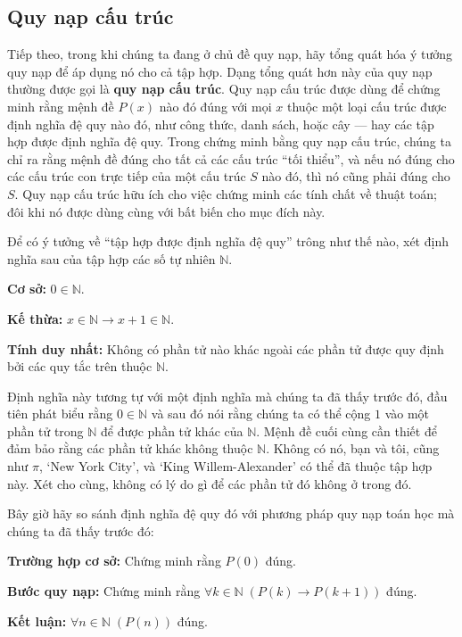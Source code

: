 \subsection{Quy nạp cấu trúc}

Tiếp theo, trong khi chúng ta đang ở chủ đề quy nạp, hãy tổng quát hóa ý tưởng quy nạp để áp dụng nó cho cả tập hợp. Dạng tổng quát hơn này của quy nạp thường được gọi là \textbf{quy nạp cấu trúc}. Quy nạp cấu trúc được dùng để chứng minh rằng mệnh đề $P(x)$ nào đó đúng với mọi $x$ thuộc một loại cấu trúc được định nghĩa đệ quy nào đó, như công thức, danh sách, hoặc cây --- hay các tập hợp được định nghĩa đệ quy. Trong chứng minh bằng quy nạp cấu trúc, chúng ta chỉ ra rằng mệnh đề đúng cho tất cả các cấu trúc ``tối thiểu'', và nếu nó đúng cho các cấu trúc con trực tiếp của một cấu trúc $S$ nào đó, thì nó cũng phải đúng cho $S$. Quy nạp cấu trúc hữu ích cho việc chứng minh các tính chất về thuật toán; đôi khi nó được dùng cùng với bất biến cho mục đích này.

Để có ý tưởng về ``tập hợp được định nghĩa đệ quy'' trông như thế nào, xét định nghĩa sau của tập hợp các số tự nhiên $\mathbb{N}$.

\medskip
\noindent\textbf{Cơ sở:} $0 \in \mathbb{N}$.

\noindent\textbf{Kế thừa:} $x \in \mathbb{N} \to x + 1 \in \mathbb{N}$.

\noindent\textbf{Tính duy nhất:} Không có phần tử nào khác ngoài các phần tử được quy định bởi các quy tắc trên thuộc $\mathbb{N}$.

\medskip
Định nghĩa này tương tự với một định nghĩa mà chúng ta đã thấy trước đó, đầu tiên phát biểu rằng $0 \in \mathbb{N}$ và sau đó nói rằng chúng ta có thể cộng $1$ vào một phần tử trong $\mathbb{N}$ để được phần tử khác của $\mathbb{N}$. Mệnh đề cuối cùng cần thiết để đảm bảo rằng các phần tử khác không thuộc $\mathbb{N}$. Không có nó, bạn và tôi, cũng như $\pi$, `New York City', và `King Willem-Alexander' có thể đã thuộc tập hợp này. Xét cho cùng, không có lý do gì để các phần tử đó không ở trong đó.

Bây giờ hãy so sánh định nghĩa đệ quy đó với phương pháp quy nạp toán học mà chúng ta đã thấy trước đó:

\medskip
\noindent\textbf{Trường hợp cơ sở:} Chứng minh rằng $P(0)$ đúng.

\noindent\textbf{Bước quy nạp:} Chứng minh rằng $\forall k \in \mathbb{N}\;(P(k) \to P(k+1))$ đúng.

\noindent\textbf{Kết luận:} $\forall n \in \mathbb{N}\;(P(n))$ đúng.

